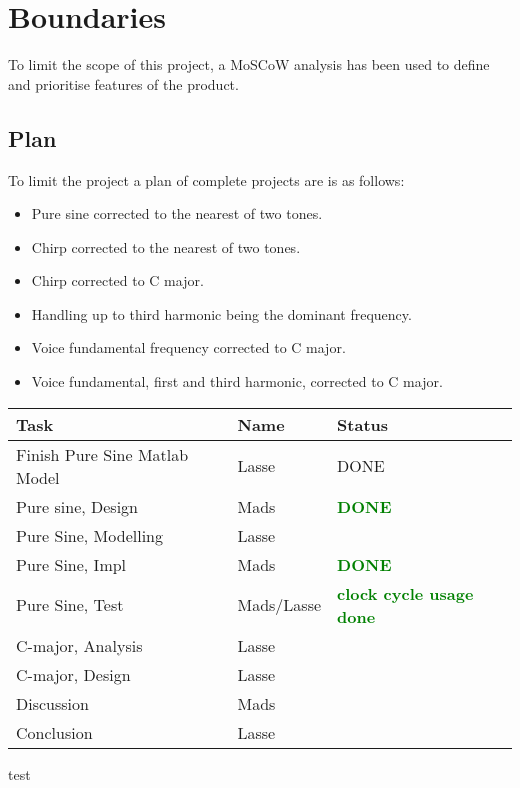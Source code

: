 
\chapter{Boundaries}
\label{sec:Boundaries}
To limit the scope of this project, a MoSCoW analysis has been used to define and prioritise features of the product.

\section{Plan}
To limit the project a plan of complete projects are is as follows:

\begin{itemize}
	\item Pure sine corrected to the nearest of two tones.
	\item Chirp corrected to the nearest of two tones.
	\item Chirp corrected to C major.
	\item Handling up to third harmonic being the dominant frequency.
	\item Voice fundamental frequency corrected to C major.
	\item Voice fundamental, first and third harmonic, corrected to C major.
\end{itemize}

\begin{table}
	\centering
	\begin{tabular}{l l l}
		\toprule
		Task & Name & Status \\
		\midrule
		Finish Pure Sine Matlab Model & Lasse & DONE \\
		Pure sine, Design & Mads & \textcolor{green}{\textbf{DONE}}\\
		Pure Sine, Modelling & Lasse & \\
		Pure Sine, Impl & Mads & \textcolor{green}{\textbf{DONE}} \\
		Pure Sine, Test & Mads/Lasse & \textcolor{green}{\textbf{clock cycle usage done}}\\
		C-major, Analysis & Lasse & \\
		C-major, Design & Lasse & \\
		Discussion & Mads & \\
		Conclusion & Lasse & \\
		\bottomrule
	\end{tabular}
\end{table}

test